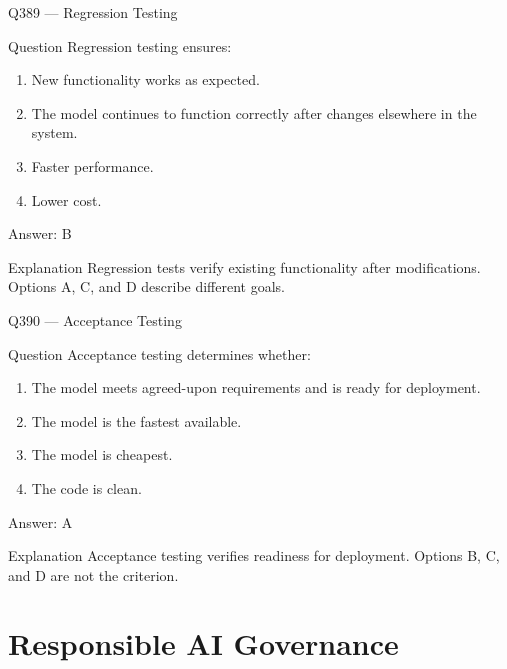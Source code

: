 \documentclass[aspectratio=169,8pt]{beamer}
\begin{document}
	\begin{frame}{Q389 --- Regression Testing}
		\begin{block}{Question}
			Regression testing ensures:
			\begin{enumerate}
				\item New functionality works as expected.
				\item The model continues to function correctly after changes elsewhere in the system.
				\item Faster performance.
				\item Lower cost.
			\end{enumerate}
		\end{block}
		\begin{exampleblock}{Answer: B}\end{exampleblock}
		\begin{block}{Explanation}
			Regression tests verify existing functionality after modifications. Options A, C, and D describe different goals.
		\end{block}
	\end{frame}
	
	\begin{frame}{Q390 --- Acceptance Testing}
		\begin{block}{Question}
			Acceptance testing determines whether:
			\begin{enumerate}
				\item The model meets agreed-upon requirements and is ready for deployment.
				\item The model is the fastest available.
				\item The model is cheapest.
				\item The code is clean.
			\end{enumerate}
		\end{block}
		\begin{exampleblock}{Answer: A}\end{exampleblock}
		\begin{block}{Explanation}
			Acceptance testing verifies readiness for deployment. Options B, C, and D are not the criterion.
		\end{block}
	\end{frame}
	
	\section{Responsible AI Governance}
	
\end{document}
